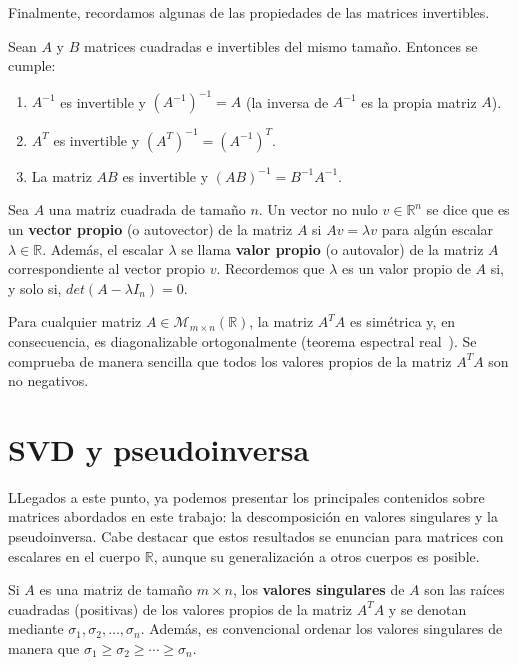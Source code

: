 Finalmente, recordamos algunas de las propiedades de las matrices invertibles.

\begin{proposicion}
    Sean $A$ y $B$ matrices cuadradas e invertibles del mismo tamaño. Entonces se cumple:

    \begin{enumerate}
        \item $A^{-1}$ es invertible y ${(A^{-1})}^{-1} = A$ (la inversa de $A^{-1}$ es la propia matriz $A$).
        \item $A^{T}$ es invertible y ${(A^{T})}^{-1} = {(A^{-1})}^{T}$.
        \item La matriz $AB$ es invertible y ${(AB)}^{-1} = B^{-1}A^{-1}$.
    \end{enumerate}
\end{proposicion}

\begin{definicion}
    Sea $A$ una matriz cuadrada de tamaño $n$. Un vector no nulo $v \in \mathbb{R}^{n}$ se dice que es un \textbf{vector propio} (o autovector) de la matriz $A$ si $Av=\lambda v$ para algún escalar $\lambda \in \mathbb{R}$. Además, el escalar $\lambda$ se llama \textbf{valor propio} (o autovalor) de la matriz $A$ correspondiente al vector propio $v$. Recordemos que $\lambda$ es un valor propio de $A$ si, y solo si, $det(A-\lambda I_n)=0$.
\end{definicion}

Para cualquier matriz $A \in \mathcal{M}_{m \times n}(\mathbb{R})$, la matriz $A^{T}A$ es simétrica y, en consecuencia, es diagonalizable ortogonalmente (teorema espectral real~\cite{Blum2021}). Se comprueba de manera sencilla que todos los valores propios de la matriz $A^{T}A$ son no negativos.

\section{SVD y pseudoinversa}\label{sec:svd-pseudoinversa}

LLegados a este punto, ya podemos presentar los principales contenidos sobre matrices abordados en este trabajo: la descomposición en valores singulares y la pseudoinversa. Cabe destacar que estos resultados se enuncian para matrices con escalares en el cuerpo $\mathbb{R}$, aunque su generalización a otros cuerpos es posible.

\begin{definicion}
    Si $A$ es una matriz de tamaño $m \times n$, los \textbf{valores singulares} de $A$ son las raíces cuadradas (positivas) de los valores propios de la matriz $A^{T}A$ y se denotan mediante $\sigma_{1}, \sigma_{2}, \ldots, \sigma_{n}$. Además, es convencional ordenar los valores singulares de manera que $\sigma_{1} \geq \sigma_{2} \geq \cdots \geq \sigma_{n}$.
\end{definicion}


